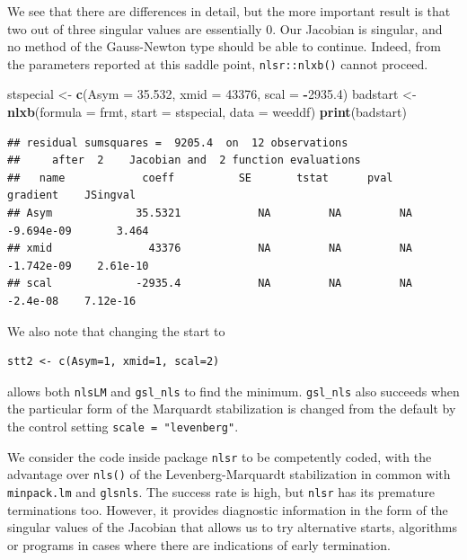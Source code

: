 \documentclass[
]{article}
\newenvironment{Shaded}{\begin{snugshade}}{\end{snugshade}}
\newcommand{\AttributeTok}[1]{\textcolor[rgb]{0.13,0.29,0.53}{#1}}
\newcommand{\DecValTok}[1]{\textcolor[rgb]{0.00,0.00,0.81}{#1}}
\newcommand{\FloatTok}[1]{\textcolor[rgb]{0.00,0.00,0.81}{#1}}
\newcommand{\FunctionTok}[1]{\textcolor[rgb]{0.13,0.29,0.53}{\textbf{#1}}}
\newcommand{\NormalTok}[1]{#1}
\newcommand{\OtherTok}[1]{\textcolor[rgb]{0.56,0.35,0.01}{#1}}
\newcommand{\SpecialCharTok}[1]{\textcolor[rgb]{0.81,0.36,0.00}{\textbf{#1}}}
\begin{document}
We see that there are differences in detail, but the more important
result is that two out of three singular values are essentially 0. Our
Jacobian is singular, and no method of the Gauss-Newton type should be
able to continue. Indeed, from the parameters reported at this saddle
point, \texttt{nlsr::nlxb()} cannot proceed.

\begin{Shaded}
\begin{Highlighting}[]
\NormalTok{stspecial }\OtherTok{\textless{}{-}} \FunctionTok{c}\NormalTok{(}\AttributeTok{Asym =} \FloatTok{35.532}\NormalTok{,  }\AttributeTok{xmid =} \DecValTok{43376}\NormalTok{,  }\AttributeTok{scal =} \SpecialCharTok{{-}}\FloatTok{2935.4}\NormalTok{)}
\NormalTok{badstart }\OtherTok{\textless{}{-}} \FunctionTok{nlxb}\NormalTok{(}\AttributeTok{formula =}\NormalTok{ frmt, }\AttributeTok{start =}\NormalTok{ stspecial, }\AttributeTok{data =}\NormalTok{ weeddf)}
\FunctionTok{print}\NormalTok{(badstart)}
\end{Highlighting}
\end{Shaded}

\begin{verbatim}
## residual sumsquares =  9205.4  on  12 observations
##     after  2    Jacobian and  2 function evaluations
##   name            coeff          SE       tstat      pval      gradient    JSingval   
## Asym             35.5321            NA         NA         NA  -9.694e-09       3.464  
## xmid               43376            NA         NA         NA  -1.742e-09    2.61e-10  
## scal             -2935.4            NA         NA         NA    -2.4e-08    7.12e-16
\end{verbatim}

We also note that changing the start to

\begin{verbatim}
stt2 <- c(Asym=1, xmid=1, scal=2)
\end{verbatim}

allows both \texttt{nlsLM} and \texttt{gsl\_nls} to find the minimum.
\texttt{gsl\_nls} also succeeds when the particular form of the
Marquardt stabilization is changed from the default by the control
setting \texttt{scale\ =\ "levenberg"}.

We consider the code inside package \texttt{nlsr} to be competently
coded, with the advantage over \texttt{nls()} of the Levenberg-Marquardt
stabilization in common with \texttt{minpack.lm} and \texttt{glsnls}.
The success rate is high, but \texttt{nlsr} has its premature
terminations too. However, it provides diagnostic information in the
form of the singular values of the Jacobian that allows us to try
alternative starts, algorithms or programs in cases where there are
indications of early termination.
\end{document}
